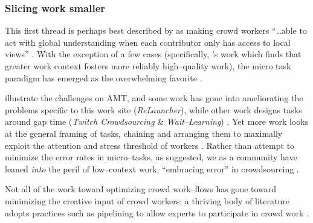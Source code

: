 \documentclass[trackingWork]{subfiles}
\begin{document}
\subsubsection[slicing work into smaller parts]{Slicing work smaller
}\label{sec:Slicing}

\subsubsubsection{\crowdworkpers}
This first thread is
perhaps best described by \citeauthor{verroios2014context} as
making crowd workers ``\dots able to act with
global understanding when each contributor only has access to local views''
\cite{verroios2014context}.
With the exception of a few cases
(specifically, \citeauthor{Kinnaird:2012:WTM:2389176.2389219}'s work
which finds that greater work context fosters more reliably high--quality work),
the micro task paradigm has emerged as the overwhelming favorite
\cite{selfsourcingTeevan2014,selfsourcingTeevan2016,
      cheng2015break,Kinnaird:2012:WTM:2389176.2389219}.


\citeauthor{taskSearch} illustrate the challenges on AMT,
and some work has gone into ameliorating the problems specific to this work site
(\textit{ReLauncher}), %
while other work designs tasks around gap time
(\textit{Twitch Crowdsourcing} \& \textit{Wait--Learning})
\cite{taskSearch,KucherbaevReLauncher,Vaish:2014:TCC:2611222.2556996,
      Cai:2015:WLW:2702123.2702267}.
Yet more work looks at the general framing of tasks,
chaining and arranging them to maximally exploit
the attention and stress threshold %
of workers
\cite{Cai:2016:CRI:2858036.2858237}.
Rather than attempt to minimize the error rates in micro--tasks,
as \citeauthor{Kinnaird:2012:WTM:2389176.2389219} suggested,
we as a community have leaned \textit{into} the peril of
low--context work,
``embracing error'' in crowdsourcing
\cite{embracingErrorKrishna}.

Not all of the work toward optimizing crowd work--flows has gone toward
minimizing the creative input of crowd workers;
a thriving body of literature adopts
practices such as pipelining to allow experts to participate in crowd work
\cite{foundry}.
\end{document}
